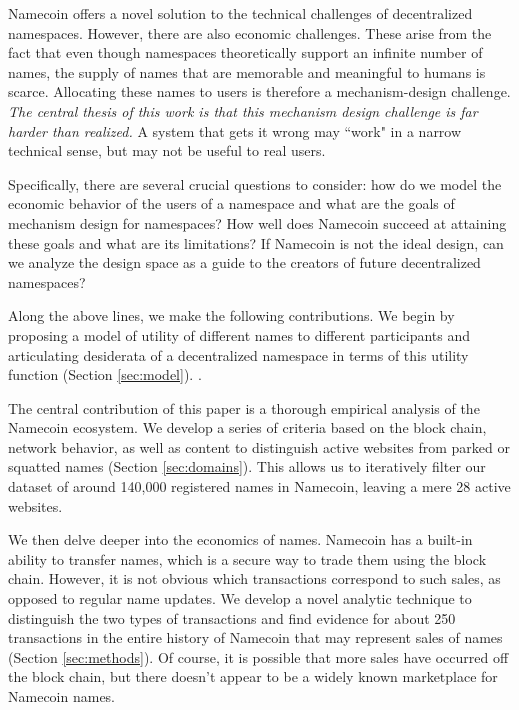 Namecoin offers a novel solution to the technical challenges of decentralized namespaces. However, there are also economic challenges. These arise from the fact that even though namespaces theoretically support an infinite number of names, the supply of names that are memorable and meaningful to humans is scarce. Allocating these names to users is therefore a mechanism-design challenge. {\em The central thesis of this work is that this mechanism design challenge is far harder than realized.} A system that gets it wrong may ``work" in a narrow technical sense, but may not be useful to real users.

Specifically, there are several crucial questions to consider: how do we model the economic behavior of the users of a namespace and what are the goals of mechanism design for namespaces? How well does Namecoin succeed at attaining these goals and what are its limitations? If Namecoin is not the ideal design, can we analyze the design space as a guide to the creators of future decentralized namespaces?

Along the above lines, we make the following contributions. We begin by proposing a model of utility of different names to different participants and articulating desiderata of a decentralized namespace in terms of this utility function (Section \ref{sec:model}). \hi{[Elaborate]}.

The central contribution of this paper is a thorough empirical analysis of the Namecoin ecosystem. We develop a series of criteria based on the block chain, network behavior, as well as content to distinguish active websites from parked or squatted names (Section \ref{sec:domains}). This allows us to iteratively filter our dataset of around 140,000 registered names in Namecoin, leaving a mere 28 active websites.

We then delve deeper into the economics of names. Namecoin has a built-in ability to transfer names, which is a secure way to trade them using the block chain. However, it is not obvious which transactions correspond to such sales, as opposed to regular name updates. We develop a novel analytic technique to distinguish the two types of transactions and find evidence for about 250 transactions in the entire history of Namecoin that may represent sales of names (Section \ref{sec:methods}). Of course, it is possible that more sales have occurred off the block chain, but there doesn't appear to be a widely known marketplace for Namecoin names.

